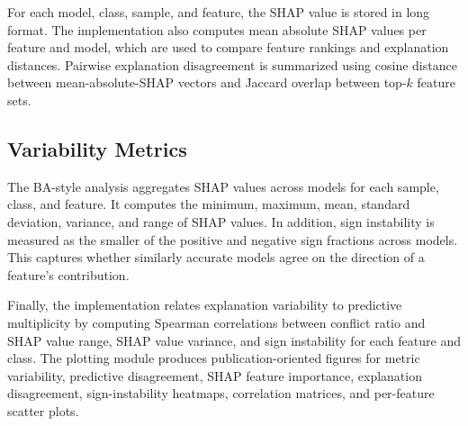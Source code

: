 For each model, class, sample, and feature, the SHAP value is stored in long format. The implementation also computes mean absolute SHAP values per feature and model, which are used to compare feature rankings and explanation distances. Pairwise explanation disagreement is summarized using cosine distance between mean-absolute-SHAP vectors and Jaccard overlap between top-\(k\) feature sets.

\subsection{Variability Metrics}

The BA-style analysis aggregates SHAP values across models for each sample, class, and feature. It computes the minimum, maximum, mean, standard deviation, variance, and range of SHAP values. In addition, sign instability is measured as the smaller of the positive and negative sign fractions across models. This captures whether similarly accurate models agree on the direction of a feature's contribution.

Finally, the implementation relates explanation variability to predictive multiplicity by computing Spearman correlations between conflict ratio and SHAP value range, SHAP value variance, and sign instability for each feature and class. The plotting module produces publication-oriented figures for metric variability, predictive disagreement, SHAP feature importance, explanation disagreement, sign-instability heatmaps, correlation matrices, and per-feature scatter plots.
